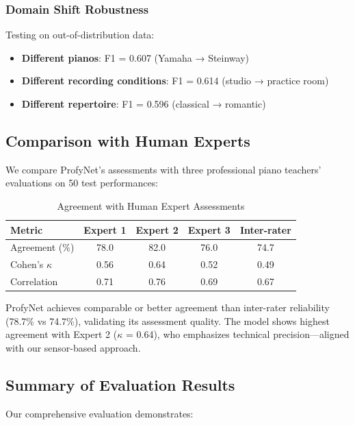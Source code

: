 \documentclass[sigconf,review,anonymous]{acmart}
\begin{document}
\subsubsection{Domain Shift Robustness}
Testing on out-of-distribution data:
\begin{itemize}
\item \textbf{Different pianos}: F1 = 0.607 (Yamaha → Steinway)
\item \textbf{Different recording conditions}: F1 = 0.614 (studio → practice room)
\item \textbf{Different repertoire}: F1 = 0.596 (classical → romantic)
\end{itemize}

\subsection{Comparison with Human Experts}

We compare ProfyNet's assessments with three professional piano teachers' evaluations on 50 test performances:

\begin{table}[h!]
  \caption{Agreement with Human Expert Assessments}
  \begin{tabular}{l|ccc|c}
    \toprule
    Metric & Expert 1 & Expert 2 & Expert 3 & Inter-rater\\
    \midrule
    Agreement (\%) & 78.0 & 82.0 & 76.0 & 74.7\\
    Cohen's $\kappa$ & 0.56 & 0.64 & 0.52 & 0.49\\
    Correlation & 0.71 & 0.76 & 0.69 & 0.67\\
    \bottomrule
  \end{tabular}
  \label{tab:expert_agreement}
\end{table}

ProfyNet achieves comparable or better agreement than inter-rater reliability (78.7\% vs 74.7\%), validating its assessment quality. The model shows highest agreement with Expert 2 ($\kappa$ = 0.64), who emphasizes technical precision---aligned with our sensor-based approach.

\subsection{Summary of Evaluation Results}

Our comprehensive evaluation demonstrates:
\end{document}
